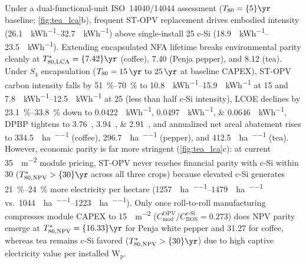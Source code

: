 \documentclass[preprint,12pt,a4paper]{elsarticle}
\begin{document}
Under a dual-functional-unit ISO~14040/14044 assessment ($T_{80}=\qty{5}{\yr}$ baseline; \cref{fig:tea_lca}b), frequent ST-OPV replacement drives embodied intensity (\qtyrange{26.1}{32.7}{\gCOtwoe\per\kWh}) above single-install \qty{25}{\yr} c-Si (\qtyrange{18.9}{23.5}{\gCOtwoe\per\kWh}). Extending encapsulated NFA lifetime breaks environmental parity cleanly at $T_{80,\mathrm{LCA}}^* = \qty{7.42}{\yr}$ (coffee), \qty{7.40}{\yr} (Penja pepper), and \qty{8.12}{\yr} (tea). Under $S_4$ encapsulation ($T_{80}=\qtyrange{15}{25}{\yr}$ at baseline CAPEX), ST-OPV carbon intensity falls by \qtyrange{51}{70}{\percent} to \qtyrange{10.8}{15.9}{\gCOtwoe\per\kWh} at \qty{15}{\yr} and \qtyrange{7.8}{12.5}{\gCOtwoe\per\kWh} at \qty{25}{\yr} (less than half c-Si intensity), LCOE declines by \qtyrange{23.1}{33.8}{\percent} down to \qtylist{0.0422;0.0497;0.0646}{\USD\per\kWh}, $\mathrm{DPBP}$ tightens to \qtylist{3.76;3.94;2.91}{\yr}, and annualized net areal abatement rises to \qty{334.5}{\tCOtwoe\per\hectare\per\yr} (coffee), \qty{296.7}{\tCOtwoe\per\hectare\per\yr} (pepper), and \qty{412.5}{\tCOtwoe\per\hectare\per\yr} (tea). However, economic parity is far more stringent (\cref{fig:tea_lca}c): at current \qty{35}{\USD\per\square\meter} module pricing, ST-OPV never reaches financial parity with c-Si within \qty{30}{\yr} ($T_{80,\mathrm{NPV}}^* > \qty{30}{\yr}$ across all three crops) because elevated c-Si generates \qtyrange{21}{24}{\percent} more electricity per hectare (\qtyrange{1257}{1479}{\MWh\per\hectare\per\yr} vs.\ \qtyrange{1044}{1223}{\MWh\per\hectare\per\yr}). Only once roll-to-roll manufacturing compresses module CAPEX to \qty{15}{\USD\per\square\meter} ($C_{\mathrm{mod}}^{\mathrm{OPV}} / C_{\mathrm{BOS}}^{\mathrm{c\text{-}Si}} = \num{0.273}$) does NPV parity emerge at $T_{80,\mathrm{NPV}}^* = \qty{16.33}{\yr}$ for Penja white pepper and \qty{31.27}{\yr} for coffee, whereas tea remains c-Si favored ($T_{80,\mathrm{NPV}}^* > \qty{30}{\yr}$) due to high captive electricity value per installed $\mathrm{W_p}$.
\end{document}
